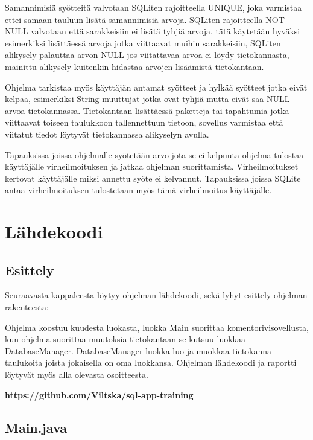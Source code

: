 \documentclass[11pt,a4paper]{article}
\begin{document}
Samannimisiä syötteitä valvotaan SQLiten rajoitteella UNIQUE, joka varmistaa ettei samaan tauluun lisätä samannimisiä arvoja. SQLiten rajoitteella NOT NULL valvotaan että sarakkeisiin ei lisätä tyhjiä arvoja, tätä käytetään hyväksi esimerkiksi lisättäessä arvoja jotka viittaavat muihin sarakkeisiin, SQLiten alikysely palauttaa arvon NULL jos viitattavaa arvoa ei löydy tietokannasta, mainittu alikysely kuitenkin hidastaa arvojen lisäämistä tietokantaan.

Ohjelma tarkistaa myös käyttäjän antamat syötteet ja hylkää syötteet jotka eivät kelpaa, esimerkiksi String-muuttujat jotka ovat tyhjiä mutta eivät saa NULL arvoa tietokannassa. Tietokantaan lisättäessä paketteja tai tapahtumia jotka viittaavat toiseen taulukkoon tallennettuun tietoon, sovellus varmistaa että viitatut tiedot löytyvät tietokannassa alikyselyn avulla.

Tapauksissa joissa ohjelmalle syötetään arvo jota se ei kelpuuta ohjelma tulostaa käyttäjälle virheilmoituksen ja jatkaa ohjelman suorittamista. Virheilmoitukset kertovat käyttäjälle miksi annettu syöte ei kelvannut. Tapauksissa joissa SQLite antaa virheilmoituksen tulostetaan myös tämä virheilmoitus käyttäjälle. 

\newpage
\section{Lähdekoodi}

\subsection*{Esittely}
Seuraavasta kappaleesta löytyy ohjelman lähdekoodi, sekä lyhyt esittely ohjelman rakenteesta:

Ohjelma koostuu kuudesta luokasta, luokka Main suorittaa komentorivisovellusta, kun ohjelma suorittaa muutoksia tietokantaan se kutsuu luokkaa DatabaseManager. DatabaseManager-luokka luo ja muokkaa tietokanna taulukoita joista jokaisella on oma luokkansa. Ohjelman lähdekoodi ja raportti löytyvät myös alla olevasta osoitteesta. 

\begin{center}
\textbf{https://github.com/Viltska/sql-app-training}
\end{center}
\newpage

\subsection*{Main.java}

\newpage
\end{document}
